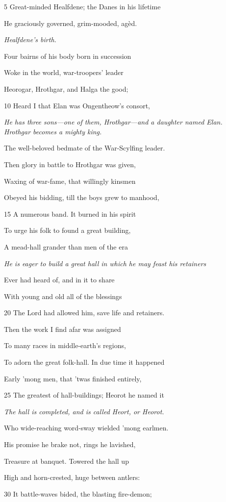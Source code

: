 5
Great-minded Healfdene; the Danes in his lifetime

He graciously governed, grim-mooded, agèd.

\emph{Healfdene’s birth.}

Four bairns of his body born in succession

Woke in the world, war-troopers’ leader

Heorogar, Hrothgar, and Halga the good;

10
Heard I that Elan was Ongentheow’s consort,

\emph{He has three sons—one
of them,
Hrothgar—and a
daughter named
Elan. Hrothgar
becomes a mighty
king.}

The well-beloved bedmate of the War-Scylfing leader.

Then glory in battle to Hrothgar was given,

Waxing of war-fame, that willingly kinsmen

Obeyed his bidding, till the boys grew to manhood,

15
A numerous band. It burned in his spirit

To urge his folk to found a great building,

A mead-hall grander than men of the era

\emph{He is eager to
build a great hall
in which he may
feast his retainers}

Ever had heard of, and in it to share

With young and old all of the blessings

20
The Lord had allowed him, save life and retainers.

Then the work I find afar was assigned

To many races in middle-earth’s regions,

To adorn the great folk-hall. In due time it happened

Early ’mong men, that ’twas finished entirely,

25
The greatest of hall-buildings; Heorot he named it

\emph{The hall is completed,
and is called Heort, or
Heorot.}

Who wide-reaching word-sway wielded ’mong earlmen.

His promise he brake not, rings he lavished,

Treasure at banquet. Towered the hall up

High and horn-crested, huge between antlers:

30
It battle-waves bided, the blasting fire-demon;

